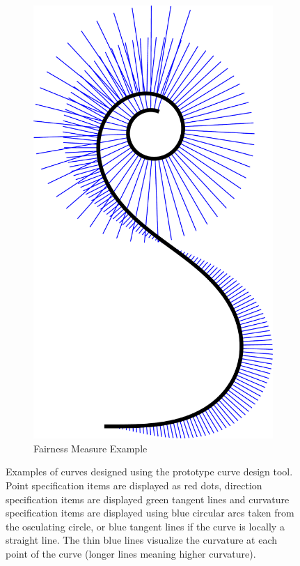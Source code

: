 \documentclass[a4paper]{article}
\begin{document}
\begin{figure}[htb]
\begin{subfigure}[b]{5 \textwidth / 13}
					\includegraphics[width=\textwidth]{content/output/examples_prototype_fairness.pdf}
					\caption{Fairness Measure Example}
					\label{figure:examples_prototype_fairness}
				\end{subfigure}
				\caption{Examples of curves designed using the prototype curve design tool. Point specification items are displayed as red dots, direction specification items are displayed green tangent lines and curvature specification items are displayed using blue circular arcs taken from the osculating circle, or blue tangent lines if the curve is locally a straight line. The thin blue lines visualize the curvature at each point of the curve (longer lines meaning higher curvature).}
				\label{figure:examples_prototype}
			\end{figure}
\end{document}
